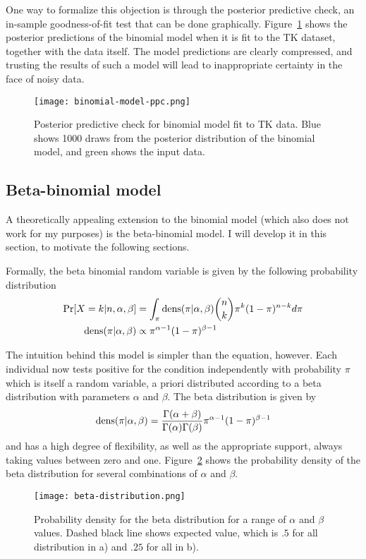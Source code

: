 One way to formalize this objection is through the posterior predictive
check, an in-sample goodness-of-fit test that can be done
graphically.  Figure~\ref{fig:theory-rate_model-binom_ppc} shows the
posterior predictions of the binomial model when it is fit to the TK
dataset, together with the data itself.  The model predictions are
clearly compressed, and trusting the results of such a model will lead
to inappropriate certainty in the face of noisy data.

\begin{figure}[ht]
\begin{center}
\texttt{[image: binomial-model-ppc.png]}
\end{center}
\caption{Posterior predictive check for binomial model fit to TK
  data.  Blue shows 1000 draws from the posterior distribution of the
  binomial model, and green shows the input data.}
\label{fig:theory-rate_model-binom_ppc}
\end{figure}




\subsection{Beta-binomial model}
A theoretically appealing extension to the binomial model (which also
does not work for my purposes) is the beta-binomial model.  I will
develop it in this section, to motivate the following sections.

Formally, the beta binomial random variable is given by the following
probability distribution
\begin{align*}
\operatorname{Pr}[X = k|n, \alpha, \beta] 
  &= \int_{\pi}\operatorname{dens}(\pi|\alpha, \beta) \binom{n}{k}\pi^k(1-\pi)^{n-k}
d\pi\\
\operatorname{dens}(\pi|\alpha, \beta) &\propto \pi^{\alpha-1}(1-\pi)^{\beta-1}
\end{align*}

The intuition behind this model is simpler than the equation, however.
Each individual now tests positive for the condition independently
with probability $\pi$ which is itself a random variable, a priori
distributed according to a beta distribution with parameters $\alpha$
and $\beta$. The beta distribution is given by 
\[
\operatorname{dens}(\pi|\alpha, \beta) =
\frac{\Gamma(\alpha+\beta)}{\Gamma(\alpha)\Gamma(\beta)}\pi^{\alpha-1}(1-\pi)^{\beta-1}
\]
and has a high degree of flexibility, as well as the appropriate
support, always taking values between zero and one.
Figure~\ref{fig:theory-rate_model-beta} shows the probability density
of the beta distribution for several combinations of $\alpha$ and
$\beta$.
\begin{figure}[ht]
\begin{center}
\texttt{[image: beta-distribution.png]}
\end{center}
\caption{Probability density for the beta distribution for a range of
  $\alpha$ and $\beta$ values. Dashed black line shows expected value,
which is $.5$ for all distribution in a) and $.25$ for all in b).}
\label{fig:theory-rate_model-beta}
\end{figure}

